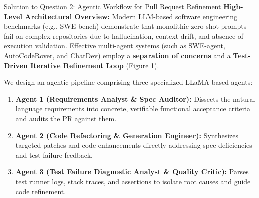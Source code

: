 \documentclass[11pt,a4paper]{article}
\begin{document}
\begin{solutionbox}{Solution to Question 2: Agentic Workflow for Pull Request Refinement}
\textbf{High-Level Architectural Overview:}
Modern LLM-based software engineering benchmarks (e.g., SWE-bench) demonstrate that monolithic zero-shot prompts fail on complex repositories due to hallucination, context drift, and absence of execution validation. Effective multi-agent systems (such as SWE-agent, AutoCodeRover, and ChatDev) employ a \textbf{separation of concerns} and a \textbf{Test-Driven Iterative Refinement Loop} (Figure 1).

We design an agentic pipeline comprising three specialized LLaMA-based agents:
\begin{enumerate}[noitemsep]
    \item \textbf{Agent 1 (Requirements Analyst \& Spec Auditor):} Dissects the natural language requirements into concrete, verifiable functional acceptance criteria and audits the PR against them.
    \item \textbf{Agent 2 (Code Refactoring \& Generation Engineer):} Synthesizes targeted patches and code enhancements directly addressing spec deficiencies and test failure feedback.
    \item \textbf{Agent 3 (Test Failure Diagnostic Analyst \& Quality Critic):} Parses test runner logs, stack traces, and assertions to isolate root causes and guide code refinement.
\end{enumerate}

\begin{center}
\end{center}
\end{solutionbox}
\end{document}
